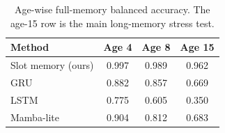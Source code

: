 \begin{table}[H]
\centering
\footnotesize
\caption{Age-wise full-memory balanced accuracy. The age-15 row is the main long-memory stress test.}
\label{tab:age-comparison}
\begin{tabular}{lccc}
\toprule
Method & Age 4 & Age 8 & Age 15\\
\midrule
Slot memory (ours) & 0.997 & 0.989 & 0.962\\
GRU & 0.882 & 0.857 & 0.669\\
LSTM & 0.775 & 0.605 & 0.350\\
Mamba-lite & 0.904 & 0.812 & 0.683\\
\bottomrule
\end{tabular}
\end{table}
